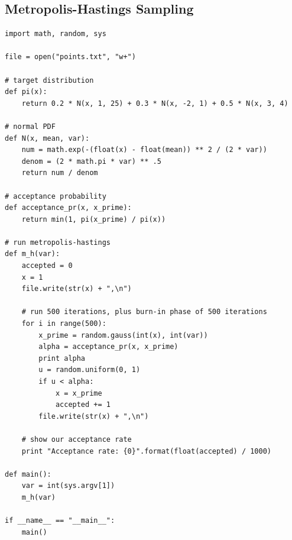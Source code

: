\documentclass{article}
\begin{document}
        \subsection*{Metropolis-Hastings Sampling}
        \begin{verbatim}
import math, random, sys

file = open("points.txt", "w+")

# target distribution
def pi(x):
    return 0.2 * N(x, 1, 25) + 0.3 * N(x, -2, 1) + 0.5 * N(x, 3, 4)

# normal PDF
def N(x, mean, var):
    num = math.exp(-(float(x) - float(mean)) ** 2 / (2 * var))
    denom = (2 * math.pi * var) ** .5
    return num / denom

# acceptance probability
def acceptance_pr(x, x_prime):
    return min(1, pi(x_prime) / pi(x))

# run metropolis-hastings
def m_h(var):
    accepted = 0
    x = 1
    file.write(str(x) + ",\n")

    # run 500 iterations, plus burn-in phase of 500 iterations
    for i in range(500):
        x_prime = random.gauss(int(x), int(var))
        alpha = acceptance_pr(x, x_prime)
        print alpha
        u = random.uniform(0, 1)
        if u < alpha:
            x = x_prime
            accepted += 1
        file.write(str(x) + ",\n")

    # show our acceptance rate       
    print "Acceptance rate: {0}".format(float(accepted) / 1000)

def main():
    var = int(sys.argv[1])
    m_h(var)

if __name__ == "__main__":
    main()
        \end{verbatim}
        
\end{document}

